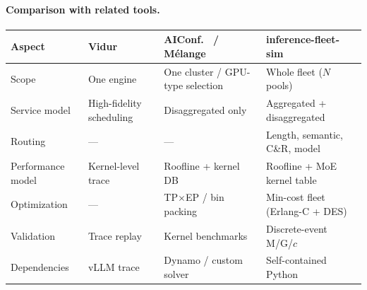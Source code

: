 \documentclass[11pt,a4paper]{article}
\begin{document}
\paragraph{Comparison with related tools.}

\begin{center}
\begin{tabular}{lp{2.8cm}p{2.8cm}p{2.8cm}}
\toprule
Aspect & Vidur~\citep{vidur2024} & AIConf.~\citep{xu2025aiconfigurator} /
  M\'{e}lange~\citep{griggs2024melange} & inference-fleet-sim \\
\midrule
Scope
  & One engine
  & One cluster / GPU-type selection
  & Whole fleet ($N$ pools) \\
Service model
  & High-fidelity scheduling
  & Disaggregated only
  & Aggregated + disaggregated \\
Routing
  & ---
  & ---
  & Length, semantic, C\&R, model \\
Performance model
  & Kernel-level trace
  & Roofline + kernel DB
  & Roofline + MoE kernel table \\
Optimization
  & ---
  & TP$\times$EP / bin packing
  & Min-cost fleet (Erlang-C + DES) \\
Validation
  & Trace replay
  & Kernel benchmarks
  & Discrete-event M/G/$c$ \\
Dependencies
  & vLLM trace
  & Dynamo / custom solver
  & Self-contained Python \\
\bottomrule
\end{tabular}
\end{center}



\end{document}
